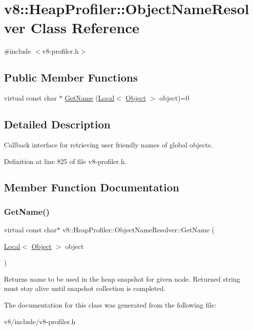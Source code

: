 \hypertarget{classv8_1_1HeapProfiler_1_1ObjectNameResolver}{}\section{v8\+:\+:Heap\+Profiler\+:\+:Object\+Name\+Resolver Class Reference}
\label{classv8_1_1HeapProfiler_1_1ObjectNameResolver}


{\ttfamily \#include $<$v8-\/profiler.\+h$>$}

\subsection*{Public Member Functions}
\begin{DoxyCompactItemize}
\item 
virtual const char $\ast$ \mbox{\hyperlink{classv8_1_1HeapProfiler_1_1ObjectNameResolver_aa9ac9e83806c7c746b652f435cf66622}{Get\+Name}} (\mbox{\hyperlink{classv8_1_1Local}{Local}}$<$ \mbox{\hyperlink{classv8_1_1Object}{Object}} $>$ object)=0
\end{DoxyCompactItemize}


\subsection{Detailed Description}
Callback interface for retrieving user friendly names of global objects. 

Definition at line 825 of file v8-\/profiler.\+h.



\subsection{Member Function Documentation}
\mbox{\label{classv8_1_1HeapProfiler_1_1ObjectNameResolver_aa9ac9e83806c7c746b652f435cf66622}} 
\subsubsection{\texorpdfstring{Get\+Name()}{GetName()}}
{\footnotesize\ttfamily virtual const char$\ast$ v8\+::\+Heap\+Profiler\+::\+Object\+Name\+Resolver\+::\+Get\+Name (\begin{DoxyParamCaption}\item[{\mbox{\hyperlink{classv8_1_1Local}{Local}}$<$ \mbox{\hyperlink{classv8_1_1Object}{Object}} $>$}]{object }\end{DoxyParamCaption})\hspace{0.3cm}{\ttfamily [pure virtual]}}

Returns name to be used in the heap snapshot for given node. Returned string must stay alive until snapshot collection is completed. 

The documentation for this class was generated from the following file\+:\begin{DoxyCompactItemize}
\item 
v8/include/v8-\/profiler.\+h\end{DoxyCompactItemize}
